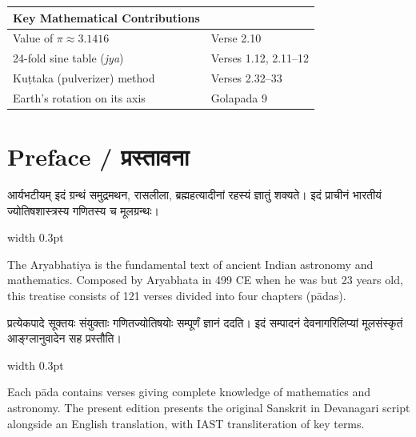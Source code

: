 \documentclass[11pt,a4paper]{article}
\newlength{\leftcolwidth}
\newlength{\rightcolwidth}
\newcommand{\dev}[1]{{\devanagarifont #1}}
\newenvironment{sanskritcol}{\begin{minipage}[t]{\leftcolwidth}\devanagarifont}{\end{minipage}}
\newenvironment{englishcol}{\begin{minipage}[t]{\rightcolwidth}\small}{\end{minipage}}
\begin{document}
\vspace{0.5cm}
\begin{center}
\begin{tabular}{ll}
\toprule
\textbf{Key Mathematical Contributions} & \\
\midrule
Value of $\pi \approx 3.1416$ & Verse 2.10\\
24-fold sine table (\textit{jya}) & Verses 1.12, 2.11--12\\
Ku\d{t}taka (pulverizer) method & Verses 2.32--33\\
Earth's rotation on its axis & Golapada 9\\
\bottomrule
\end{tabular}
\end{center}
\clearpage

\section*{Preface / \dev{प्रस्तावना}}

\noindent
\begin{sanskritcol}
आर्यभटीयम् इदं ग्रन्थं समुद्रमथन, रासलीला, ब्रह्महत्यादीनां रहस्यं ज्ञातुं शक्यते। इदं प्राचीनं भारतीयं ज्योतिषशास्त्रस्य गणितस्य च मूलग्रन्थः।
\end{sanskritcol}%
\hfill\vrule width 0.3pt\hfill
\begin{englishcol}
The Aryabhatiya is the fundamental text of ancient Indian astronomy and mathematics. Composed by Aryabhata in 499 CE when he was but 23 years old, this treatise consists of 121 verses divided into four chapters (p\=adas).
\end{englishcol}
\par\medskip

\vspace{0.5cm}
\noindent
\begin{sanskritcol}
प्रत्येकपादे सूक्तयः संयुक्ताः गणितज्योतिषयोः सम्पूर्णं ज्ञानं ददति। इदं सम्पादनं देवनागरिलिप्यां मूलसंस्कृतं आङ्ग्लानुवादेन सह प्रस्तौति।
\end{sanskritcol}%
\hfill\vrule width 0.3pt\hfill
\begin{englishcol}
Each p\=ada contains verses giving complete knowledge of mathematics and astronomy. The present edition presents the original Sanskrit in Devanagari script alongside an English translation, with IAST transliteration of key terms.
\end{englishcol}
\par\medskip

\clearpage
\end{document}
